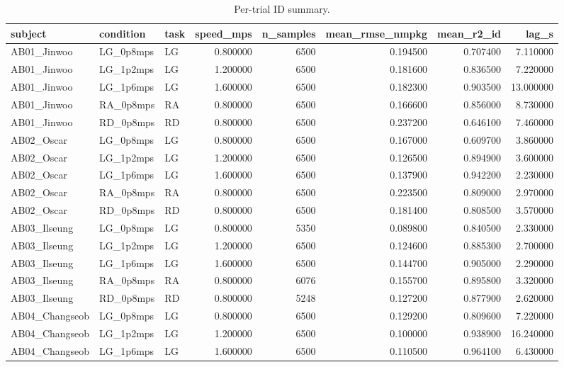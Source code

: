 \begin{table}
\caption{Per-trial ID summary.}
\label{tab:table3_id_per_trial}
\begin{tabular}{lllrrrrr}
\toprule
subject & condition & task & speed\_mps & n\_samples & mean\_rmse\_nmpkg & mean\_r2\_id & lag\_s \\
\midrule
AB01\_Jinwoo & LG\_0p8mps & LG & 0.800000 & 6500 & 0.194500 & 0.707400 & 7.110000 \\
AB01\_Jinwoo & LG\_1p2mps & LG & 1.200000 & 6500 & 0.181600 & 0.836500 & 7.220000 \\
AB01\_Jinwoo & LG\_1p6mps & LG & 1.600000 & 6500 & 0.182300 & 0.903500 & 13.000000 \\
AB01\_Jinwoo & RA\_0p8mps & RA & 0.800000 & 6500 & 0.166600 & 0.856000 & 8.730000 \\
AB01\_Jinwoo & RD\_0p8mps & RD & 0.800000 & 6500 & 0.237200 & 0.646100 & 7.460000 \\
AB02\_Oscar & LG\_0p8mps & LG & 0.800000 & 6500 & 0.167000 & 0.609700 & 3.860000 \\
AB02\_Oscar & LG\_1p2mps & LG & 1.200000 & 6500 & 0.126500 & 0.894900 & 3.600000 \\
AB02\_Oscar & LG\_1p6mps & LG & 1.600000 & 6500 & 0.137900 & 0.942200 & 2.230000 \\
AB02\_Oscar & RA\_0p8mps & RA & 0.800000 & 6500 & 0.223500 & 0.809000 & 2.970000 \\
AB02\_Oscar & RD\_0p8mps & RD & 0.800000 & 6500 & 0.181400 & 0.808500 & 3.570000 \\
AB03\_Ilseung & LG\_0p8mps & LG & 0.800000 & 5350 & 0.089800 & 0.840500 & 2.330000 \\
AB03\_Ilseung & LG\_1p2mps & LG & 1.200000 & 6500 & 0.124600 & 0.885300 & 2.700000 \\
AB03\_Ilseung & LG\_1p6mps & LG & 1.600000 & 6500 & 0.144700 & 0.905000 & 2.290000 \\
AB03\_Ilseung & RA\_0p8mps & RA & 0.800000 & 6076 & 0.155700 & 0.895800 & 3.320000 \\
AB03\_Ilseung & RD\_0p8mps & RD & 0.800000 & 5248 & 0.127200 & 0.877900 & 2.620000 \\
AB04\_Changseob & LG\_0p8mps & LG & 0.800000 & 6500 & 0.129200 & 0.809600 & 7.220000 \\
AB04\_Changseob & LG\_1p2mps & LG & 1.200000 & 6500 & 0.100000 & 0.938900 & 16.240000 \\
AB04\_Changseob & LG\_1p6mps & LG & 1.600000 & 6500 & 0.110500 & 0.964100 & 6.430000 \\

\end{tabular}
\end{table}
